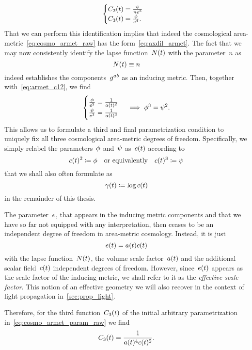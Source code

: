 \begin{enumerate}
\begin{equation}
\begin{cases}
				C_2(t)=\frac{\psi}{ne^3}\\
				C_3(t)=\frac{\phi}{e^4}
			\mathpunct{.}
			\end{cases}
		\end{equation}
		That we can perform this identification implies that indeed the cosmological area-metric~\eqref{eq:cosmo_armet_raw} has the form~\eqref{eq:axdil_armet}. The fact that we may now consistently identify the lapse function~$N(t)$ with the parameter~$n$ as
		\begin{equation}
			N(t)\equiv n
		\end{equation}
		indeed establishes the components~$g^{ab}$ as an inducing \FLRW{} metric. Then, together with~\eqref{eq:armet_c12}, we find
		\begin{align}
			\begin{cases}
				\frac{\phi}{e^2}=\frac{1}{a(t)^2}\\
				\frac{\psi}{e^3}=\frac{1}{a(t)^3}
			\end{cases} \implies
			\phi^3=\psi^2\label{eq:axdil_rel}
			\mathpunct{.}
		\end{align}
		This allows us to formulate a third and final parametrization condition to uniquely fix all three cosmological area-metric degrees of freedom. Specifically, we simply relabel the parameters~$\phi$ and~$\psi$ as~$c(t)$ according to
		\begin{equation}\label{eq:armet_param_scalec}
			c(t)^2\coloneqq\phi \quad \text{or equivalently} \quad c(t)^3\coloneqq\psi
		\end{equation}
		that we shall also often formulate as
		\begin{equation}\label{eq:lnc}
			\gamma(t)\coloneqq\log{c(t)}
		\end{equation}
		in the remainder of this thesis.
		
		The parameter~$e$, that appears in the inducing \FLRW{} metric components and that we have so far not equipped with any interpretation, then ceases to be an independent degree of freedom in area-metric cosmology. Instead, it is just
		\begin{equation}\label{eq:effscale}
			e(t)=a(t)c(t)
		\end{equation}
		with the lapse function~$N(t)$, the volume scale factor~$a(t)$ and the additional scalar field~$c(t)$ independent degrees of freedom. However, since~$e(t)$ appears as the scale factor of the inducing \FLRW{} metric, we shall refer to it as the \emph{effective scale factor}. This notion of an effective geometry we will also recover in the context of light propagation in~\autoref{sec:prop_light}.
		
		Therefore, for the third function~$C_3(t)$ of the initial arbitrary parametrization in~\eqref{eq:cosmo_armet_param_raw} we find
		\begin{equation}
			C_3(t)=\frac{1}{a(t)^4c(t)^2}
			\mathpunct{.}
		\end{equation}
\end{enumerate}

